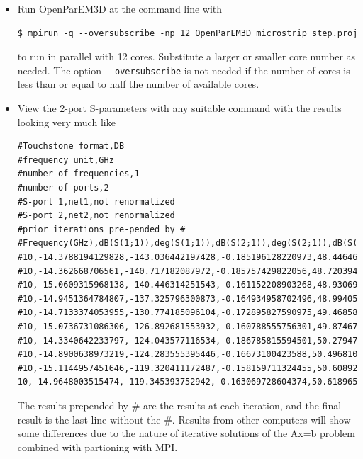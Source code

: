 \documentclass[titlepage]{article}
\renewcommand\_{\textunderscore\linebreak[1]}
\begin{document}
\begin{itemize}
\item Run OpenParEM3D at the command line with
\begin{Verbatim}[fontsize=\small]
   $ mpirun -q --oversubscribe -np 12 OpenParEM3D microstrip_step.proj
\end{Verbatim}
to run in parallel with 12 cores.  Substitute a larger or smaller core number as needed.  The option \verb+--oversubscribe+ is not needed if the number of cores is less than or equal to half the number of available cores.
\item View the 2-port S-parameters with any suitable command with the results looking very much like
\begin{Verbatim}[fontsize=\tiny]
#Touchstone format,DB
#frequency unit,GHz
#number of frequencies,1
#number of ports,2
#S-port 1,net1,not renormalized
#S-port 2,net2,not renormalized
#prior iterations pre-pended by #
#Frequency(GHz),dB(S(1;1)),deg(S(1;1)),dB(S(2;1)),deg(S(2;1)),dB(S(1;2)),deg(S(1;2)),dB(S(2;2)),deg(S(2;2))
#10,-14.3788194129828,-143.036442197428,-0.185196128220973,48.4464694369318,-0.185196128220973,48.4464694369318,-14.3755919817412,59.8969360333806
#10,-14.362668706561,-140.717182087972,-0.185757429822056,48.7203941057591,-0.185757429822056,48.7203941057591,-14.3605686334538,58.1152503635806
#10,-15.0609315968138,-140.446314251543,-0.161152208903268,48.9306989849119,-0.161152208903268,48.9306989849119,-15.0598550941328,58.2646381098206
#10,-14.9451364784807,-137.325796300873,-0.164934958702496,48.9940535036704,-0.164934958702496,48.9940535036704,-14.9442860056249,55.2642922102583
#10,-14.7133374053955,-130.774185096104,-0.172895827590975,49.4685808388707,-0.172895827590975,49.4685808388707,-14.7098431887646,49.664383434521
#10,-15.0736731086306,-126.892681553932,-0.160788555756301,49.8746771388686,-0.160788555756301,49.8746771388686,-15.0675315888474,46.6021770759152
#10,-14.3340642233797,-124.043577116534,-0.186785815594501,50.2794740952806,-0.186785815594501,50.2794740952806,-14.3297637712834,44.5637330342644
#10,-14.8900638973219,-124.283555395446,-0.16673100423588,50.4968103406548,-0.16673100423588,50.4968103406548,-14.8857288440341,45.2485990207109
#10,-15.1144957451646,-119.320411172487,-0.158159711324455,50.6089280321123,-0.158159711324455,50.6089280321123,-15.1098168809666,40.5542876526387
10,-14.9648003515474,-119.345393752942,-0.163069728604374,50.618965517188,-0.163069728604374,50.618965517188,-14.9590784928379,40.6098185523797
\end{Verbatim}
The results prepended by \# are the results at each iteration, and the final result is the last line without the \#.  Results from other computers will show some differences due to the nature of iterative solutions of the Ax=b problem combined with partioning with MPI.


\end{itemize}
\end{document}
